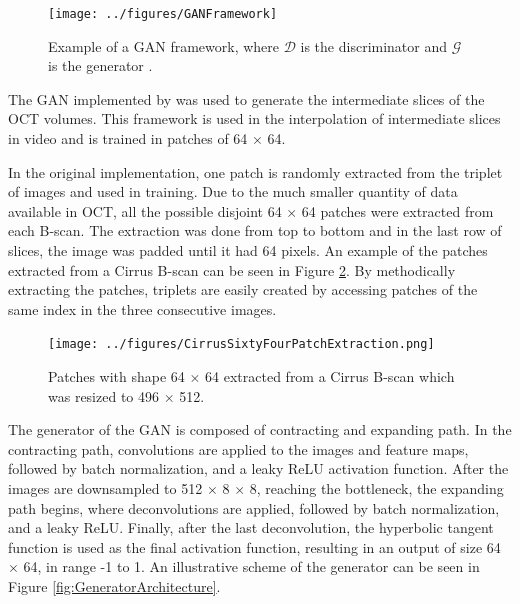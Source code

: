 \begin{figure}[!ht]
	\centering
	\texttt{[image: ../figures/GANFramework]}
	\caption{Example of a GAN framework, where $\mathcal{D}$ is the discriminator and $\mathcal{G}$ is the generator \cite{Creswell2018}.}
	\label{fig:GANFramework}
\end{figure}

The GAN implemented by \textcite{Tran2020} was used to generate the intermediate slices of the OCT volumes. This framework is used in the interpolation of intermediate slices in video and is trained in patches of 64 $\times$ 64.
\par
In the original implementation, one patch is randomly extracted from the triplet of images and used in training. Due to the much smaller quantity of data available in OCT, all the possible disjoint 64 $\times$ 64 patches were extracted from each B-scan. The extraction was done from top to bottom and in the last row of slices, the image was padded until it had 64 pixels. An example of the patches extracted from a Cirrus B-scan can be seen in Figure \ref{fig:CirrusSixtyFourPatchExtraction}. By methodically extracting the patches, triplets are easily created by accessing patches of the same index in the three consecutive images.

\begin{figure}[!ht]
	\centering
	\texttt{[image: ../figures/CirrusSixtyFourPatchExtraction.png]}
	\caption{Patches with shape 64 $\times$ 64 extracted from a Cirrus B-scan which was resized to 496 $\times$ 512.}
	\label{fig:CirrusSixtyFourPatchExtraction}
\end{figure}

The generator of the GAN is composed of contracting and expanding path. In the contracting path, convolutions are applied to the images and feature maps, followed by batch normalization, and a leaky ReLU activation function. After the images are downsampled to 512 $\times$ 8 $\times$ 8, reaching the bottleneck, the expanding path begins, where deconvolutions are applied, followed by batch normalization, and a leaky ReLU. Finally, after the last deconvolution, the hyperbolic tangent function is used as the final activation function, resulting in an output of size 64 $\times$ 64, in range -1 to 1. An illustrative scheme of the generator can be seen in Figure \ref{fig:GeneratorArchitecture}.

